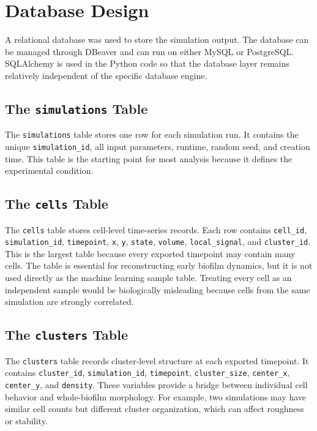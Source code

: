 \documentclass[12pt,a4paper,oneside]{report}
\begin{document}
\section{Database Design}
A relational database was used to store the simulation output. The database can be managed through DBeaver and can run on either MySQL or PostgreSQL. SQLAlchemy is used in the Python code so that the database layer remains relatively independent of the specific database engine.

\subsection{The \texttt{simulations} Table}
The \texttt{simulations} table stores one row for each simulation run. It contains the unique \texttt{simulation\_id}, all input parameters, runtime, random seed, and creation time. This table is the starting point for most analysis because it defines the experimental condition.

\subsection{The \texttt{cells} Table}
The \texttt{cells} table stores cell-level time-series records. Each row contains \texttt{cell\_id}, \texttt{simulation\_id}, \texttt{timepoint}, \texttt{x}, \texttt{y}, \texttt{state}, \texttt{volume}, \texttt{local\_signal}, and \texttt{cluster\_id}. This is the largest table because every exported timepoint may contain many cells. The table is essential for reconstructing early biofilm dynamics, but it is not used directly as the machine learning sample table. Treating every cell as an independent sample would be biologically misleading because cells from the same simulation are strongly correlated.

\subsection{The \texttt{clusters} Table}
The \texttt{clusters} table records cluster-level structure at each exported timepoint. It contains \texttt{cluster\_id}, \texttt{simulation\_id}, \texttt{timepoint}, \texttt{cluster\_size}, \texttt{center\_x}, \texttt{center\_y}, and \texttt{density}. These variables provide a bridge between individual cell behavior and whole-biofilm morphology. For example, two simulations may have similar cell counts but different cluster organization, which can affect roughness or stability.
\end{document}
